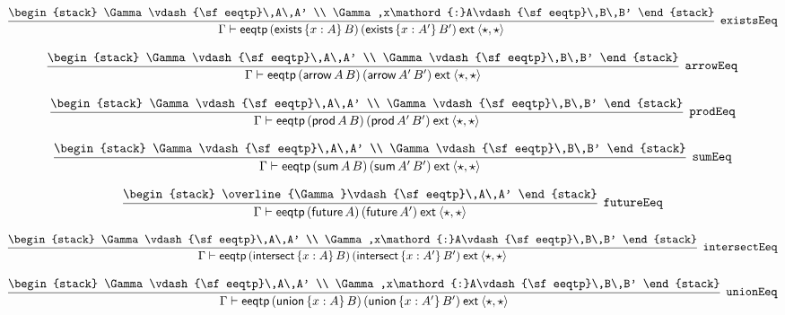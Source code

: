 \[
\infer[{\tt existsEeq}]{\Gamma \vdash {\sf eeqtp}\,({\sf exists}\,\{x : A\}\,B)\,({\sf exists}\,\{x : A'\}\,B')\:{\sf ext}\:\langle \star ,\star \rangle }{
\begin{stack}
\Gamma \vdash {\sf eeqtp}\,A\,A'
\\
\Gamma ,x\mathord{:}A\vdash {\sf eeqtp}\,B\,B'
\end{stack}}
\]

\[
\infer[{\tt arrowEeq}]{\Gamma \vdash {\sf eeqtp}\,({\sf arrow}\,A\,B)\,({\sf arrow}\,A'\,B')\:{\sf ext}\:\langle \star ,\star \rangle }{
\begin{stack}
\Gamma \vdash {\sf eeqtp}\,A\,A'
\\
\Gamma \vdash {\sf eeqtp}\,B\,B'
\end{stack}}
\]

\[
\infer[{\tt prodEeq}]{\Gamma \vdash {\sf eeqtp}\,({\sf prod}\,A\,B)\,({\sf prod}\,A'\,B')\:{\sf ext}\:\langle \star ,\star \rangle }{
\begin{stack}
\Gamma \vdash {\sf eeqtp}\,A\,A'
\\
\Gamma \vdash {\sf eeqtp}\,B\,B'
\end{stack}}
\]

\[
\infer[{\tt sumEeq}]{\Gamma \vdash {\sf eeqtp}\,({\sf sum}\,A\,B)\,({\sf sum}\,A'\,B')\:{\sf ext}\:\langle \star ,\star \rangle }{
\begin{stack}
\Gamma \vdash {\sf eeqtp}\,A\,A'
\\
\Gamma \vdash {\sf eeqtp}\,B\,B'
\end{stack}}
\]

\[
\infer[{\tt futureEeq}]{\Gamma \vdash {\sf eeqtp}\,({\sf future}\,A)\,({\sf future}\,A')\:{\sf ext}\:\langle \star ,\star \rangle }{
\begin{stack}
\overline{\Gamma}\vdash {\sf eeqtp}\,A\,A'
\end{stack}}
\]

\[
\infer[{\tt intersectEeq}]{\Gamma \vdash {\sf eeqtp}\,({\sf intersect}\,\{x : A\}\,B)\,({\sf intersect}\,\{x : A'\}\,B')\:{\sf ext}\:\langle \star ,\star \rangle }{
\begin{stack}
\Gamma \vdash {\sf eeqtp}\,A\,A'
\\
\Gamma ,x\mathord{:}A\vdash {\sf eeqtp}\,B\,B'
\end{stack}}
\]

\[
\infer[{\tt unionEeq}]{\Gamma \vdash {\sf eeqtp}\,({\sf union}\,\{x : A\}\,B)\,({\sf union}\,\{x : A'\}\,B')\:{\sf ext}\:\langle \star ,\star \rangle }{
\begin{stack}
\Gamma \vdash {\sf eeqtp}\,A\,A'
\\
\Gamma ,x\mathord{:}A\vdash {\sf eeqtp}\,B\,B'
\end{stack}}
\]

